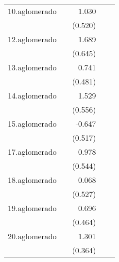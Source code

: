 {\begin{longtable}{l*{4}{D{.}{.}{-1}}}
\addlinespace
10.aglomerado&                     &       1.030\sym{*}  &                     &                     \\
            &                     &     (0.520)         &                     &                     \\
\addlinespace
12.aglomerado&                     &       1.689\sym{**} &                     &                     \\
            &                     &     (0.645)         &                     &                     \\
\addlinespace
13.aglomerado&                     &       0.741         &                     &                     \\
            &                     &     (0.481)         &                     &                     \\
\addlinespace
14.aglomerado&                     &       1.529\sym{**} &                     &                     \\
            &                     &     (0.556)         &                     &                     \\
\addlinespace
15.aglomerado&                     &      -0.647         &                     &                     \\
            &                     &     (0.517)         &                     &                     \\
\addlinespace
17.aglomerado&                     &       0.978         &                     &                     \\
            &                     &     (0.544)         &                     &                     \\
\addlinespace
18.aglomerado&                     &       0.068         &                     &                     \\
            &                     &     (0.527)         &                     &                     \\
\addlinespace
19.aglomerado&                     &       0.696         &                     &                     \\
            &                     &     (0.464)         &                     &                     \\
\addlinespace
20.aglomerado&                     &       1.301\sym{***}&                     &                     \\
            &                     &     (0.364)         &                     &                     \\

\end{longtable}}
